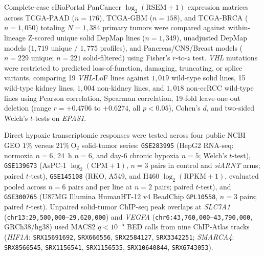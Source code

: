 \documentclass[10pt,twocolumn]{article}
\begin{document}
Complete-case cBioPortal PanCancer $\log_2(\text{RSEM}+1)$ expression matrices across TCGA-PAAD ($n = 176$), TCGA-GBM ($n = 158$), and TCGA-BRCA ($n = 1,050$) totaling $N = 1,384$ primary tumors were compared against within-lineage Z-scored unique solid DepMap lines ($n = 1,349$), unadjusted DepMap models ($1,719$ unique / $1,775$ profiles), and Pancreas/CNS/Breast models ($n = 229$ unique; $n = 221$ solid-filtered) using Fisher's $r$-to-$z$ test. \textit{VHL} mutations were restricted to predicted loss-of-function, damaging, truncating, or splice variants, comparing 19 \textit{VHL}-LoF lines against $1,019$ wild-type solid lines, 15 wild-type kidney lines, $1,004$ non-kidney lines, and $1,018$ non-ccRCC wild-type lines using Pearson correlation, Spearman correlation, 19-fold leave-one-out deletion (range $r = +0.4706$ to $+0.6274$, all $p < 0.05$), Cohen's $d$, and two-sided Welch's $t$-tests on \textit{EPAS1}.

Direct hypoxic transcriptomic responses were tested across four public NCBI GEO $1\%$ versus $21\%\ \text{O}_2$ solid-tumor series: \texttt{GSE283995} (HepG2 RNA-seq: normoxia $n = 6$, 24~h $n = 6$, and day-6 chronic hypoxia $n = 5$; Welch's $t$-test), \texttt{GSE139673} (AsPC-1 $\log_2(\text{CPM}+1)$, $n = 3$ pairs in control and \textit{siARNT} arms; paired $t$-test), \texttt{GSE145108} (RKO, A549, and H460 $\log_2(\text{RPKM}+1)$, evaluated pooled across $n = 6$ pairs and per line at $n = 2$ pairs; paired $t$-test), and \texttt{GSE300765} (U87MG Illumina HumanHT-12 v4 BeadChip \texttt{GPL10558}, $n = 3$ pairs; paired $t$-test). Unpaired solid-tumor ChIP-seq peak overlaps at \textit{SLC7A1} (\texttt{chr13:29,500,000--29,620,000}) and \textit{VEGFA} (\texttt{chr6:43,760,000--43,790,000}, GRCh38/hg38) used MACS2 $q < 10^{-5}$ BED calls from nine ChIP-Atlas tracks (\textit{HIF1A}: \texttt{SRX15691692}, \texttt{SRX666556}, \texttt{SRX2584127}, \texttt{SRX3342251}; \textit{SMARCA4}: \texttt{SRX8566545}, \texttt{SRX1156541}, \texttt{SRX1156535}, \texttt{SRX10640844}, \texttt{SRX6743053}).
\end{document}
